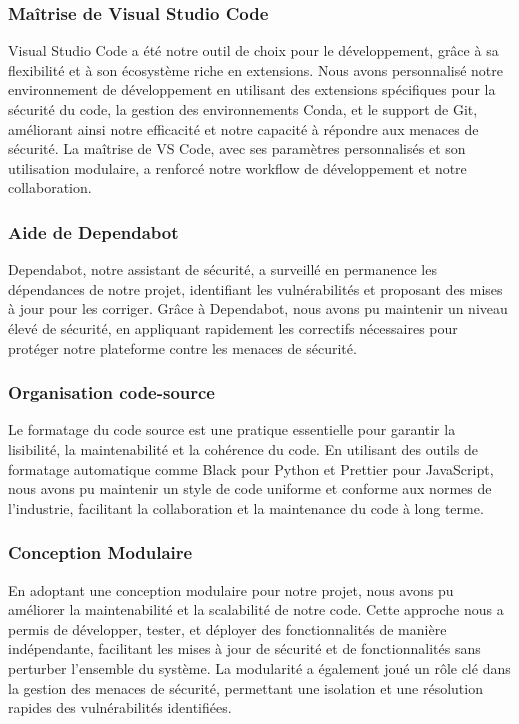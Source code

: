 \subsubsection{Maîtrise de Visual Studio Code}

Visual Studio Code a été notre outil de choix pour le développement, grâce à sa flexibilité et à son écosystème riche en extensions. Nous avons personnalisé notre environnement de développement en utilisant des extensions spécifiques pour la sécurité du code, la gestion des environnements Conda, et le support de Git, améliorant ainsi notre efficacité et notre capacité à répondre aux menaces de sécurité. La maîtrise de VS Code, avec ses paramètres personnalisés et son utilisation modulaire, a renforcé notre workflow de développement et notre collaboration.

\subsubsection{Aide de Dependabot}

Dependabot, notre assistant de sécurité, a surveillé en permanence les dépendances de notre projet, identifiant les vulnérabilités et proposant des mises à jour pour les corriger. Grâce à Dependabot, nous avons pu maintenir un niveau élevé de sécurité, en appliquant rapidement les correctifs nécessaires pour protéger notre plateforme contre les menaces de sécurité.

\subsubsection{Organisation code-source}

Le formatage du code source est une pratique essentielle pour garantir la lisibilité, la maintenabilité et la cohérence du code. En utilisant des outils de formatage automatique comme Black pour Python et Prettier pour JavaScript, nous avons pu maintenir un style de code uniforme et conforme aux normes de l'industrie, facilitant la collaboration et la maintenance du code à long terme.

\subsubsection{Conception Modulaire}

En adoptant une conception modulaire pour notre projet, nous avons pu améliorer la maintenabilité et la scalabilité de notre code. Cette approche nous a permis de développer, tester, et déployer des fonctionnalités de manière indépendante, facilitant les mises à jour de sécurité et de fonctionnalités sans perturber l'ensemble du système. La modularité a également joué un rôle clé dans la gestion des menaces de sécurité, permettant une isolation et une résolution rapides des vulnérabilités identifiées.

